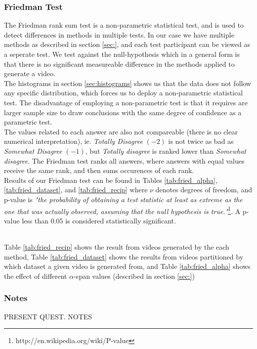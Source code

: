 \subsubsection{Friedman Test}
%
The Friedman rank sum test is a non-parametric statistical test, and is used to detect differences in methods in multiple tests. In our case we have multiple methods as described in section \ref{sec:}, and each test participant can be viewed as a seperate test. We test against the null-hypothesis which in a general form is that there is no significant measureable difference in the methods applied to generate a video.\\
%
The histograms in section \ref{sec:histograms} shows us that the data does not follow any specific distribution, which forces us to deploy a non-parametric statistical test. The disadvantage of employing a non-parametric test is that it requires are larger sample size to draw conclusions with the same degree of confidence as a parametric test.\\
%
The values related to each answer are also not compareable (there is no clear numerical interpretation), ie. \textit{Totally Disagree} $(-2)$ is not twice as bad as \textit{Somewhat Disagree} $(-1)$, but \textit{Totally disagree} is ranked lower than \textit{Somewhat disagree}. The Friedman test ranks all answers, where answers with equal values receive the same rank, and then sums occurences of each rank.\\
%
Results of our Friedman test can be found in Tables \ref{tab:fried_alpha}, \ref{tab:fried_dataset}, and \ref{tab:fried_recip} where $\nu$ denotes degrees of freedom, and p-value is \textit{"the probability of obtaining a test statistic at least as extreme as the one that was actually observed, assuming that the null hypothesis is true."}\footnote{http://en.wikipedia.org/wiki/P-value}. A p-value less than $0.05$ is considered statistically significant.



%
\\ %
Table \ref{tab:fried_recip} shows the result from videos generated by the each method, Table \ref{tab:fried_dataset} shows the results from videos partitioned by which dataset a given video is generated from, and Table \ref{tab:fried_alpha} shows the effect of different $\alpha$-span values (described in section \ref{sec:})
%
\subsubsection{Notes}
%
PRESENT QUEST. NOTES
%
